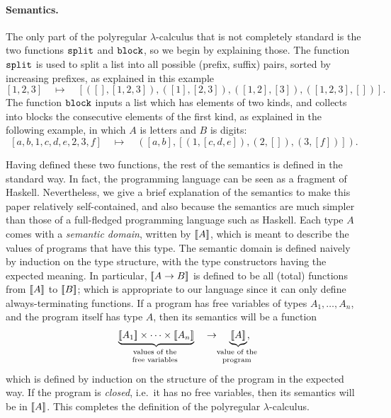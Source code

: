 \paragraph*{Semantics.} The only part of the polyregular $\lambda$-calculus that is not completely standard is the two functions $\mathtt{split}$ and $\mathtt{block}$, so we begin by explaining those.  The function 
   $\mathtt{split}$ is used to split a list into all possible (prefix, suffix) pairs, sorted by increasing prefixes,  as  explained in this example 
\begin{equation} \label{def-split}
[1,2,3] 
\quad \mapsto \quad 
[([],[1,2,3]), ([1],[2,3]), ([1,2],[3]), ([1,2,3],[])].
\end{equation}
    The function $\mathtt{block}$ inputs a list which has elements of two kinds, and collects into blocks the consecutive  elements of the first kind, as explained in the following example, in which $A$ is letters and $B$ is digits:
  \begin{equation} \label{def-block}
        [a, b, 1, c, d, e, 2, 3, f] 
        \quad \mapsto \quad ([a,b], [(1,[c,d,e]),(2,[]),(3,[f])]).
        \end{equation}
    
Having defined these two functions, the rest of the semantics is defined in the standard way. In fact, the programming language can be seen as a fragment of Haskell. Nevertheless, we give a brief  explanation of  the semantics to make this paper relatively self-contained, and also because the semantics are much simpler than those of a full-fledged programming language such as Haskell.  Each type $A$ comes with a \emph{semantic domain}, written by $[\![A]\!]$, which is meant to describe the values of programs that have this type. The semantic domain is defined naively by induction on the type structure, with the type constructors having the expected meaning. In particular, $[\![A \to B]\!]$ is defined to be all (total) functions from $[\![A]\!]$ to $[\![B]\!]$; which is appropriate to our language since it can only define always-terminating functions.  
If a program has free variables of types $A_1,\ldots,A_n$, and the program itself has type $A$, then its semantics will be a function 
\begin{align*}
\myunderbrace{\sem {A_1} \times \cdots \times \sem{A_n}}{values of the\\ free variables} 
\quad \to \quad 
\myunderbrace{\sem{A}}{value of the\\ program},
\end{align*}
which is  defined by induction on the structure of the program in the expected way.
If the program is \emph{closed}, i.e.~it has no free variables, then its semantics will be in $[\![A]\!]$. This completes the definition of the polyregular $\lambda$-calculus.

